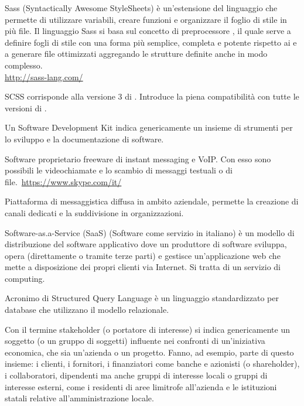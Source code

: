 Sass (Syntactically Awesome StyleSheets) è un'estensione del linguaggio  che permette di utilizzare variabili, creare funzioni e organizzare il foglio di stile in più file. Il linguaggio Sass si basa sul concetto di preprocessore , il quale serve a definire fogli di stile con una forma più semplice, completa e potente rispetto ai  e a generare file  ottimizzati aggregando le strutture definite anche in modo complesso.\\
\url{http://sass-lang.com/}

SCSS corrisponde alla versione 3 di . Introduce la piena compatibilità con tutte le versioni di .

Un Software Development Kit indica genericamente un insieme di strumenti per lo sviluppo e la documentazione di software.

Software proprietario freeware di instant messaging e VoIP. Con esso sono possibili le videochiamate e lo scambio di messaggi testuali o di file.\
\url{https://www.skype.com/it/}

Piattaforma di messaggistica diffusa in ambito aziendale, permette la creazione di canali dedicati e la suddivisione in organizzazioni. 

Software-as.a-Service (SaaS) (Software come servizio in italiano) è un modello di distribuzione del software applicativo dove un produttore di software sviluppa, opera (direttamente o tramite terze parti) e gestisce un'applicazione web che mette a disposizione dei propri clienti via Internet. Si tratta di un servizio di  computing.

Acronimo di Structured Query Language \`e un linguaggio standardizzato per database che utilizzano il modello relazionale.

Con il termine stakeholder (o portatore di interesse) si indica genericamente un soggetto (o un gruppo di soggetti) influente nei confronti di un'iniziativa economica, che sia un'azienda o un progetto.
Fanno, ad esempio, parte di questo insieme: i clienti, i fornitori, i finanziatori come banche e azionisti (o shareholder), i collaboratori, dipendenti ma anche gruppi di interesse locali o gruppi di interesse esterni, come i residenti di aree limitrofe all'azienda e le istituzioni statali relative all'amministrazione locale.

